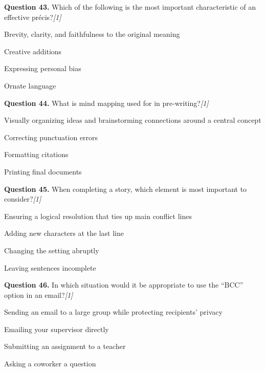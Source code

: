 \documentclass[11pt,a4paper]{article}
\newcommand{\pts}[1]{\hfill   \textit{[#1]}}
\begin{document}
\medskip




\noindent   \textbf{Question 43.} Which of the following is the most important characteristic of an effective précis?\pts{1}

\begin{parts}
  \item Brevity, clarity, and faithfulness to the original meaning
  \item Creative additions
  \item Expressing personal bias
  \item Ornate language
\end{parts}

\medskip




\noindent   \textbf{Question 44.} What is mind mapping used for in pre-writing?\pts{1}

\begin{parts}
  \item Visually organizing ideas and brainstorming connections around a central concept
  \item Correcting punctuation errors
  \item Formatting citations
  \item Printing final documents
\end{parts}

\medskip




\noindent   \textbf{Question 45.} When completing a story, which element is most important to consider?\pts{1}

\begin{parts}
  \item Ensuring a logical resolution that ties up main conflict lines
  \item Adding new characters at the last line
  \item Changing the setting abruptly
  \item Leaving sentences incomplete
\end{parts}

\medskip




\noindent   \textbf{Question 46.} In which situation would it be appropriate to use the ``BCC'' option in an email?\pts{1}

\begin{parts}
  \item Sending an email to a large group while protecting recipients' privacy
  \item Emailing your supervisor directly
  \item Submitting an assignment to a teacher
  \item Asking a coworker a question
\end{parts}
\end{document}
